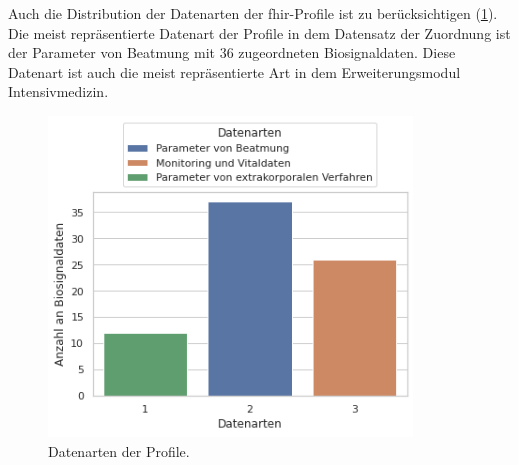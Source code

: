 Auch die Distribution der Datenarten der \ac{fhir}-Profile ist zu berücksichtigen (\ref{fig:datenarten}). Die meist repräsentierte Datenart der Profile in dem Datensatz der Zuordnung ist der \glqq Parameter von Beatmung\grqq{} mit 36 zugeordneten Biosignaldaten. Diese Datenart ist auch die meist repräsentierte Art in dem Erweiterungsmodul \glqq Intensivmedizin\grqq{}.

\clearpage

\begin{figure}[ht]
	\centering
	\includegraphics[height=8.5cm]{figures/datenarten}
	\caption[Datenarten der Profile]{Datenarten der Profile.}
	\label{fig:datenarten}
\end{figure}

